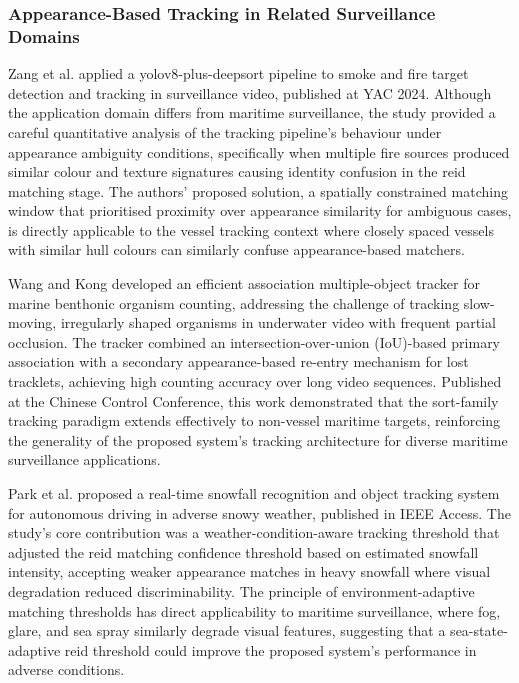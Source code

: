 \subsubsection{\textbf{Appearance-Based Tracking in Related Surveillance Domains}}
Zang et al. \cite{Zang2024} applied a \gls{yolov8}-plus-\gls{deepsort} pipeline to smoke
and fire target detection and tracking in surveillance video, published at YAC
2024. Although the application domain differs from maritime surveillance, the
study provided a careful quantitative analysis of the tracking pipeline's
behaviour under appearance ambiguity conditions, specifically when multiple fire
sources produced similar colour and texture signatures causing identity confusion
in the \gls{reid} matching stage. The authors' proposed solution, a spatially constrained
matching window that prioritised proximity over appearance similarity for ambiguous
cases, is directly applicable to the vessel tracking context where closely spaced
vessels with similar hull colours can similarly confuse appearance-based matchers.
 
Wang and Kong \cite{Wang2024} developed an efficient association multiple-object
tracker for marine benthonic organism counting, addressing the challenge of tracking
slow-moving, irregularly shaped organisms in underwater video with frequent partial
occlusion. The tracker combined an intersection-over-union (IoU)-based primary
association with a secondary appearance-based re-entry mechanism for lost tracklets,
achieving high counting accuracy over long video sequences. Published at the Chinese
Control Conference, this work demonstrated that the \gls{sort}-family tracking paradigm
extends effectively to non-vessel maritime targets, reinforcing the generality of
the proposed system's tracking architecture for diverse maritime surveillance
applications.
 
Park et al. \cite{Park2025} proposed a real-time snowfall recognition and object
tracking system for autonomous driving in adverse snowy weather, published in
IEEE Access. The study's core contribution was a weather-condition-aware tracking
threshold that adjusted the \gls{reid} matching confidence threshold based on estimated
snowfall intensity, accepting weaker appearance matches in heavy snowfall where
visual degradation reduced discriminability. The principle of environment-adaptive
matching thresholds has direct applicability to maritime surveillance, where fog,
glare, and sea spray similarly degrade visual features, suggesting that a
sea-state-adaptive \gls{reid} threshold could improve the proposed system's performance
in adverse conditions.
 
